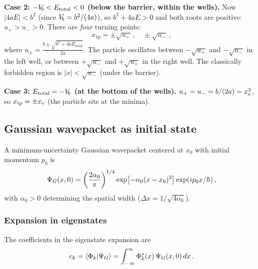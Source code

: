 \textbf{Case 2: $-V_{\!b} < E_{\text{total}} < 0$ (below the barrier, within the wells).}
Now $|4aE| < b^2$ (since $V_{\!b} = b^2/(4a)$), so $b^2 + 4aE > 0$ and both roots are positive:
$u_+ > u_- > 0$. There are \emph{four} turning points:
\begin{equation}\label{eq:4tp}
  \boxed{x_{\text{tp}} = \pm\sqrt{u_+}\,,\quad \pm\sqrt{u_-}\,,}
\end{equation}
where $u_\pm = \frac{b \pm \sqrt{b^2+4aE_{\text{total}}}}{2a}$.
The particle oscillates between $-\sqrt{u_+}$ and $-\sqrt{u_-}$ in the left well,
or between $+\sqrt{u_-}$ and $+\sqrt{u_+}$ in the right well. The classically forbidden
region is $|x| < \sqrt{u_-}$ (under the barrier).

\textbf{Case 3: $E_{\text{total}} = -V_{\!b}$ (at the bottom of the wells).}
$u_+ = u_- = b/(2a) = x_e^2$, so $x_{\text{tp}} = \pm x_e$ (the particle sits at the minima).

\subsection{Gaussian wavepacket as initial state}\label{sec:Gaussian_WP}

A minimum-uncertainty Gaussian wavepacket centered at $x_0$ with initial momentum $p_0$ is
\begin{equation}\label{eq:Psi_Gauss}
  \Psi_G(x, 0) = \left(\frac{2\alpha_0}{\pi}\right)^{1/4}
  \exp\bigl[-\alpha_0(x-x_0)^2\bigr]\exp(ip_0 x/\hbar)\,,
\end{equation}
with $\alpha_0 > 0$ determining the spatial width ($\Delta x = 1/\sqrt{4\alpha_0}$).

\subsubsection{Expansion in eigenstates}

The coefficients in the eigenstate expansion are
\begin{equation}
  c_k = \braket{\Phi_k}{\Psi_G} = \int_{-\infty}^{\infty}\Phi_k^*(x)\,\Psi_G(x,0)\,dx\,.
\end{equation}

